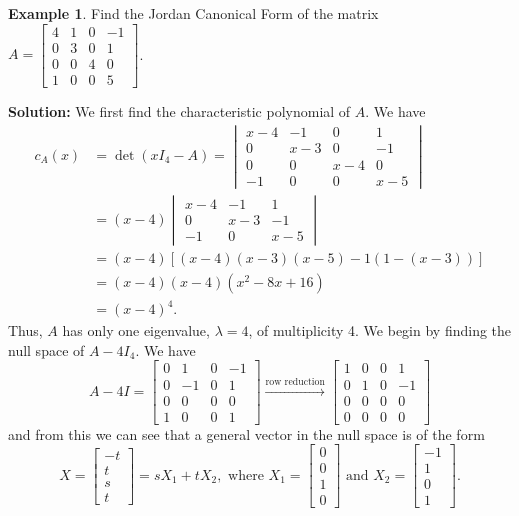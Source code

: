 \documentclass[12pt,letterpaper]{article}
\theoremstyle{definition}
\newtheorem{example}{Example}
\begin{document}
\begin{example}
 Find the Jordan Canonical Form of the matrix 
$A = \begin{bmatrix}
4&1&0&-1\\
0&3&0&1\\
0&0&4&0\\
1&0&0&5
\end{bmatrix}$.

\bigskip

{\bf Solution:} We first find the characteristic polynomial of $A$. We have
\begin{align*}
 c_A(x) &= \det(xI_4-A) = \begin{vmatrix}x-4&-1&0&1\\0&x-3&0&-1\\0&0&x-4&0\\-1&0&0&x-5\end{vmatrix}\\
& = (x-4)\begin{vmatrix}x-4&-1&1\\0&x-3&-1\\-1&0&x-5\end{vmatrix}\\
& = (x-4)[(x-4)(x-3)(x-5)-1(1-(x-3))]\\
& = (x-4)(x-4)(x^2-8x+16)\\
& = (x-4)^4.
\end{align*}
Thus, $A$ has only one eigenvalue, $\lambda = 4$, of multiplicity 4. We begin by finding the null space of $A-4I_4$. We have
\[
 A-4I = \begin{bmatrix}
         0&1&0&-1\\0&-1&0&1\\0&0&0&0\\1&0&0&1
        \end{bmatrix}\xrightarrow[]{\text{row reduction}}
        \begin{bmatrix}
         1&0&0&1\\0&1&0&-1\\0&0&0&0\\0&0&0&0
        \end{bmatrix}
\]
and from this we can see that a general vector in the null space is of the form 
\[
X=\begin{bmatrix}-t\\t\\s\\t\end{bmatrix} = sX_1+tX_2, \text{ where } X_1 = \begin{bmatrix}0\\0\\1\\0\end{bmatrix} \text{ and } X_2 = \begin{bmatrix}-1\\1\\0\\1\end{bmatrix}.                                                                                 
\]
\end{example}
\end{document}
